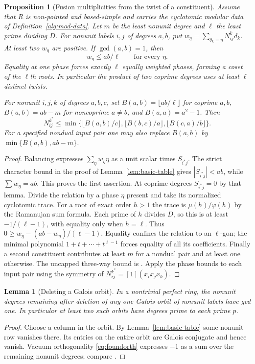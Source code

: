 \documentclass[11pt]{amsart}
\numberwithin{equation}{section}
\newtheorem{lemma}[theorem]{Lemma}
\newtheorem{proposition}[theorem]{Proposition}
\theoremstyle{definition}
\theoremstyle{plain}
\begin{document}
\begin{proposition}[Fusion multiplicities from the twist of a constituent]\label{new:fusion-phase-cap}
Assume that $R$ is non-pointed and based-simple and carries the
cyclotomic modular data of Definition~\ref{alg:mod-data}.
Let $m$ be the least nonunit degree and $\ell$ the least prime
dividing $D$. For nonunit labels $i,j$ of degrees $a,b$, put
$w_\eta=\sum_{\theta_k=\eta}N_{ij}^k d_k$.
At least two $w_\eta$ are positive. If $\gcd(a,b)=1$, then
\[
 w_\eta\le ab/\ell\qquad\text{for every }\eta.
\]
Equality at one phase forces exactly $\ell$ equally weighted phases, forming a coset of the $\ell$th roots. In particular the product of two coprime degrees uses at least $\ell$ distinct twists.

For nonunit $i,j,k$ of degrees $a,b,c$, set $B(a,b)=\lfloor ab/\ell\rfloor$ for coprime $a,b$, $B(a,b)=ab-m$ for noncoprime $a\ne b$, and $B(a,a)=a^2-1$. Then
\[
 N_{ij}^{k^*}\le\min\{\lfloor B(a,b)/c\rfloor,\lfloor B(b,c)/a\rfloor,
 \lfloor B(c,a)/b\rfloor\}.
\]
For a specified nondual input pair one may also replace $B(a,b)$ by $\min\{B(a,b),ab-m\}$.
\end{proposition}
\begin{proof}
Balancing expresses $\sum_\eta w_\eta\eta$ as a unit scalar times $S_{i^*j}$. The strict character bound in the proof of Lemma~\ref{lem:basic-table} gives $|S_{i^*j}|<ab$, while $\sum w_\eta=ab$. This proves the first assertion. At coprime degrees $S_{i^*j}=0$ by that lemma. Divide the relation by a phase $\eta$ present and take its normalized cyclotomic trace. For a root of exact order $h>1$ the trace is $\mu(h)/\varphi(h)$ by the Ramanujan sum formula. Each prime of $h$ divides $D$, so this is at least $-1/(\ell-1)$, with equality only when $h=\ell$. Thus $0\ge w_\eta-(ab-w_\eta)/(\ell-1)$. Equality confines the relation to an $\ell$-gon; the minimal polynomial $1+t+\cdots+t^{\ell-1}$ forces equality of all its coefficients. Finally a second constituent contributes at least $m$ for a nondual pair and at least one otherwise. The uncapped three-way bound is \cite[Lemma~21.7]{BDPcore}. Apply the phase bounds to each input pair using the symmetry of $N_{ij}^{k^*}=[1](x_ix_jx_k)$.
\end{proof}


\begin{lemma}[Deleting a Galois orbit]\label{lem:deletion}
In a nontrivial perfect ring, the nonunit degrees remaining after
deletion of any one Galois orbit of nonunit labels have gcd one.
In particular at least two such orbits have degrees prime to each
prime $p$.
\end{lemma}
\begin{proof}
Choose a column in the orbit. By Lemma~\ref{lem:basic-table} some
nonunit row vanishes there. Its entries on the entire orbit are
Galois conjugate and hence vanish. Vacuum orthogonality
\eqref{eq:foundorth} expresses $-1$ as a sum over the remaining
nonunit degrees; compare \cite[proof of Theorem~1.1]{DP}.
\end{proof}
\end{document}
